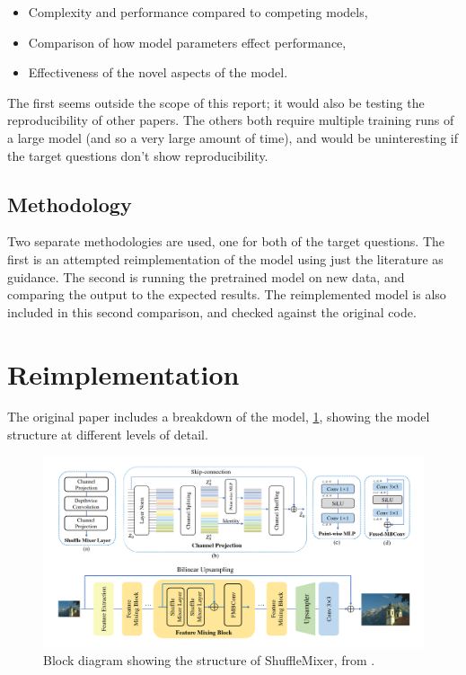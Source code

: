 \documentclass{article}
\begin{document}
    \begin{itemize}
        \item Complexity and performance compared to competing models,
        \item Comparison of how model parameters effect performance,
        \item Effectiveness of the novel aspects of the model. 
    \end{itemize}

    The first seems outside the scope of this report; it would also be testing the reproducibility of other papers. The others both require multiple training runs of a large model (and so a very large amount of time), and would be uninteresting if the target questions don't show reproducibility.

    \subsection{Methodology}

    Two separate methodologies are used, one for both of the target questions. The first is an attempted reimplementation of the model using just the literature as guidance. The second is running the pretrained model on new data, and comparing the output to the expected results. The reimplemented model is also included in this second comparison, and checked against the original code.

    \section{Reimplementation} \label{sec: reimpl}

    The original paper includes a breakdown of the model, \cref{fig:original_block_diagram}, showing the model structure at different levels of detail. 

    \begin{figure}
    \centering
    \includegraphics[width=\textwidth]{block diagram.png}
    \caption{Block diagram showing the structure of ShuffleMixer, from \citet{sun2022shufflemixer}.} \label{fig:original_block_diagram}
    \end{figure}
\end{document}
